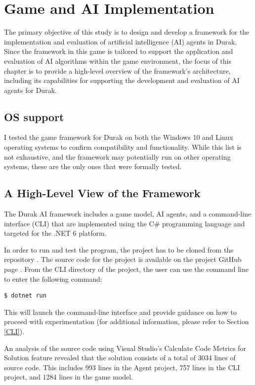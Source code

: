 \chapter{Game and AI Implementation}

The primary objective of this study is to design and develop a framework for the implementation and evaluation of artificial intelligence (AI) agents in Durak. Since the framework in this game is tailored to support the application and evaluation of AI algorithms within the game environment, the focus of this chapter is to provide a high-level overview of the framework's architecture, including its capabilities for supporting the development and evaluation of AI agents for Durak.

\section{OS support}

I tested the game framework for Durak on both the Windows 10 and Linux operating systems to confirm compatibility and functionality. While this list is not exhaustive, and the framework may potentially run on other operating systems, these are the only ones that were formally tested.

\section{A High-Level View of the Framework}

The Durak AI framework includes a game model, AI agents, and a command-line interface (CLI) that are implemented using the C\# programming language and targeted for the .NET 6 platform.

In order to run and test the program, the project has to be cloned from the repository . The source code for the project is available on the project GitHub page \citep{DurakRepo}. From the CLI directory of the project, the user can use the command line to enter the following command: 
\begin{lstlisting}
$ dotnet run
\end{lstlisting}
This will launch the command-line interface and provide guidance on how to proceed with experimentation (for additional information, please refer to Section \ref{CLI}).

An analysis of the source code using Visual Studio's Calculate Code Metrics for Solution feature revealed that the solution consists of a total of 3034 lines of source code. This includes 993 lines in the Agent project, 757 lines in the CLI project, and 1284 lines in the game model.

